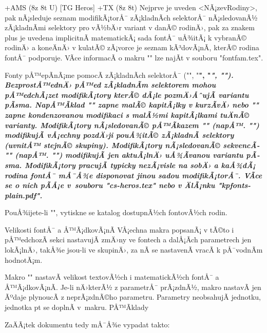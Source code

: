  {\rm \bf \it \bi } +AMS (8z 8t U)
[TG Heros]  {\caps \cond } {\rm \bf \it \bi } +TX (8z 8t)
\endtt
%
Nejprve je uveden <NÃ¡zevRodiny>, pak nÃ¡sleduje seznam modifikÃ¡torÅ¯
zÃ¡kladnÃ­ch selektorÅ¯ nÃ¡sledovanÃ½ zÃ¡kladnÃ­mi selektory pro vÃ½bÄ›r variant v
danÃ© rodinÄ›, pak za znakem plus je uvedena implicitnÃ­ matematickÃ¡ sada fontÅ¯
uÅ¾itÃ¡ k vybranÃ© rodinÄ› a koneÄnÄ› v kulatÃ© zÃ¡vorce je seznam kÃ³dovÃ¡nÃ­, kterÃ©
rodina fontÅ¯ podporuje. VÃ­ce informacÃ­ o makru "\fontfam" lze najÃ­t v
souboru "fontfam.tex".

Fonty pÅ™epÃ­nÃ¡me pomocÃ­ zÃ¡kladnÃ­ch selektorÅ¯ ("\rm", "\bf", "\it", "\bi").
BezprostÅ™ednÄ› pÅ™ed zÃ¡kladnÃ­m selektorem mohou pÅ™edchÃ¡zet {\em modifikÃ¡tory}
kterÃ© dÃ¡le pozmÄ›ÅˆujÃ­ variantu pÃ­sma. NapÅ™Ã­klad "\caps\it" zapne malÃ© kapitÃ¡lky
v kurzÃ­vÄ› nebo "\cond\caps\bf" zapne kondenzovanou modifikaci s malÃ½mi
kapitÃ¡lkami tuÄnÃ© varianty.
ModifikÃ¡tory nÃ¡sledovanÃ© pÅ™Ã­kazem "\fam" (napÅ™. "\caps\fam") modifikujÃ­
vÅ¡echny pozdÄ›ji pouÅ¾itÃ© zÃ¡kladnÃ­ selektory (uvnitÅ™ stejnÃ© skupiny).
ModifikÃ¡tory nÃ¡sledovanÃ© sekvencÃ­ "\one" (napÅ™. "\caps\one") modifikujÃ­ jen
aktuÃ¡lnÄ› uÅ¾Ã­vanou variantu pÃ­sma. ModifikÃ¡tory pracujÃ­ typicky nezÃ¡visle na
sobÄ› a kaÅ¾dÃ¡ rodina fontÅ¯ mÅ¯Å¾e disponovat jinou sadou modifikÃ¡torÅ¯. VÃ­ce se
o nich pÃ­Å¡e v~souboru "cs-heros.tex" nebo v ÄlÃ¡nku "kpfonts-plain.pdf".

PouÅ¾ijete-li "\fontfam[Catalog]", vytiskne se katalog dostupnÃ½ch fontovÃ½ch
rodin.


\sec Velikosti fontÅ¯ a Å™Ã¡dkovÃ¡nÃ­
VÅ¡echna makra popsanÃ¡ v tÃ©to i pÅ™edchozÃ­ sekci nastavujÃ­ zmÄ›ny ve fontech a dalÅ¡Ã­ch
parametrech jen lokÃ¡lnÄ›, takÅ¾e jsou-li ve skupinÄ›, 
za nÃ­ se nastavenÃ­ vracÃ­ k pÅ¯vodnÃ­m hodnotÃ¡m.

Makro "" nastavÃ­ velikost textovÃ½ch i
matematickÃ½ch fontÅ¯ a Å™Ã¡dkovÃ¡nÃ­. Je-li nÄ›kterÃ½ z parametrÅ¯ prÃ¡zdnÃ½, makro
nastavÃ­ jen Ãºdaje plynoucÃ­ z neprÃ¡zdnÃ©ho parametru. 
Parametry neobsahujÃ­ jednotku, jednotka pt se doplnÃ­ v~makru. PÅ™Ã­klady

\begtt
\typosize[10/12]    %
\typosize[11/12.5]  %
\typosize[8/]       %
\endtt

ZaÄÃ¡tek dokumentu tedy mÅ¯Å¾e vypadat takto:

\begtt
 \typosize[11.5/13]  %
\endtt


